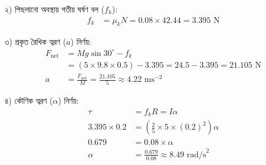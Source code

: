 \documentclass[12pt, a4paper]{article}
\begin{document}
\begin{tcolorbox}[solutionbox={সমাধান (Solution)}]
২) পিছলানো অবস্থায় গতীয় ঘর্ষণ বল ($f_k$):
\begin{align*}
    f_k &= \mu_k N = 0.08 \times 42.44 = \mathbf{3.395}\text{ N}
\end{align*}

৩) প্রকৃত রৈখিক ত্বরণ ($a$) নির্ণয়:
\begin{align*}
    F_{\text{net}} &= M g \sin 30^\circ - f_k \\
                   &= (5 \times 9.8 \times 0.5) - 3.395 = 24.5 - 3.395 = 21.105\text{ N} \\
    a &= \frac{F_{\text{net}}}{M} = \frac{21.105}{5} \approx \mathbf{4.22}\text{ ms}^{-2}
\end{align*}

৪) কৌণিক ত্বরণ ($\alpha$) নির্ণয়:
\begin{align*}
    \tau &= f_k R = I \alpha \\
    3.395 \times 0.2 &= \left(\frac{2}{5} \times 5 \times (0.2)^2\right) \alpha \\
    0.679 &= 0.08 \times \alpha \\
    \alpha &= \frac{0.679}{0.08} \approx \mathbf{8.49}\text{ rad/s}^2
\end{align*}
\end{tcolorbox}
\end{document}
